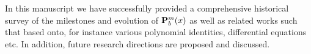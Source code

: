In this manuscript we have successfully provided a comprehensive historical survey
of the milestones and evolution of ${\mathbf{P}}\sp{m} \sb{b}(x)$
as well as related works such that based onto, for instance various polynomial identities, differential equations etc.
In addition, future research directions are proposed and discussed.
